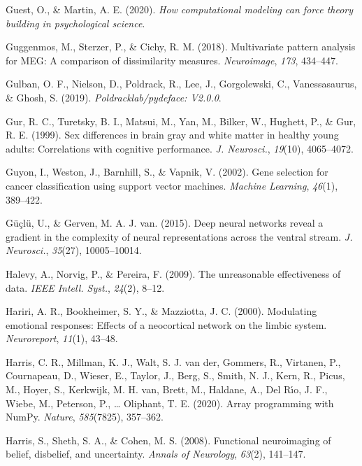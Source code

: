 \documentclass[11pt,american,]{memoir} %
\begin{document}
\leavevmode\hypertarget{ref-Guest2020-ef}{}%
Guest, O., \& Martin, A. E. (2020). \emph{How computational modeling can force theory building in psychological science}.

\leavevmode\hypertarget{ref-Guggenmos2018-rr}{}%
Guggenmos, M., Sterzer, P., \& Cichy, R. M. (2018). Multivariate pattern analysis for MEG: A comparison of dissimilarity measures. \emph{Neuroimage}, \emph{173}, 434--447.

\leavevmode\hypertarget{ref-Gulban2019-sv}{}%
Gulban, O. F., Nielson, D., Poldrack, R., Lee, J., Gorgolewski, C., Vanessasaurus, \& Ghosh, S. (2019). \emph{Poldracklab/pydeface: V2.0.0}.

\leavevmode\hypertarget{ref-Gur1999-qj}{}%
Gur, R. C., Turetsky, B. I., Matsui, M., Yan, M., Bilker, W., Hughett, P., \& Gur, R. E. (1999). Sex differences in brain gray and white matter in healthy young adults: Correlations with cognitive performance. \emph{J. Neurosci.}, \emph{19}(10), 4065--4072.

\leavevmode\hypertarget{ref-guyon2002gene}{}%
Guyon, I., Weston, J., Barnhill, S., \& Vapnik, V. (2002). Gene selection for cancer classification using support vector machines. \emph{Machine Learning}, \emph{46}(1), 389--422.

\leavevmode\hypertarget{ref-Guclu2015-qj}{}%
Güçlü, U., \& Gerven, M. A. J. van. (2015). Deep neural networks reveal a gradient in the complexity of neural representations across the ventral stream. \emph{J. Neurosci.}, \emph{35}(27), 10005--10014.

\leavevmode\hypertarget{ref-Halevy2009-cv}{}%
Halevy, A., Norvig, P., \& Pereira, F. (2009). The unreasonable effectiveness of data. \emph{IEEE Intell. Syst.}, \emph{24}(2), 8--12.

\leavevmode\hypertarget{ref-Hariri2000-sc}{}%
Hariri, A. R., Bookheimer, S. Y., \& Mazziotta, J. C. (2000). Modulating emotional responses: Effects of a neocortical network on the limbic system. \emph{Neuroreport}, \emph{11}(1), 43--48.

\leavevmode\hypertarget{ref-Harris2020-en}{}%
Harris, C. R., Millman, K. J., Walt, S. J. van der, Gommers, R., Virtanen, P., Cournapeau, D., Wieser, E., Taylor, J., Berg, S., Smith, N. J., Kern, R., Picus, M., Hoyer, S., Kerkwijk, M. H. van, Brett, M., Haldane, A., Del Rı́o, J. F., Wiebe, M., Peterson, P., \ldots{} Oliphant, T. E. (2020). Array programming with NumPy. \emph{Nature}, \emph{585}(7825), 357--362.

\leavevmode\hypertarget{ref-harris2008functional}{}%
Harris, S., Sheth, S. A., \& Cohen, M. S. (2008). Functional neuroimaging of belief, disbelief, and uncertainty. \emph{Annals of Neurology}, \emph{63}(2), 141--147.
\end{document}
